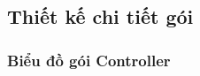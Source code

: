 \documentclass[../DoAn.tex]{subfiles}
\begin{document}
\subsection{Thiết kế chi tiết gói}


\subsubsection{Biểu đồ gói Controller}
\end{document}
